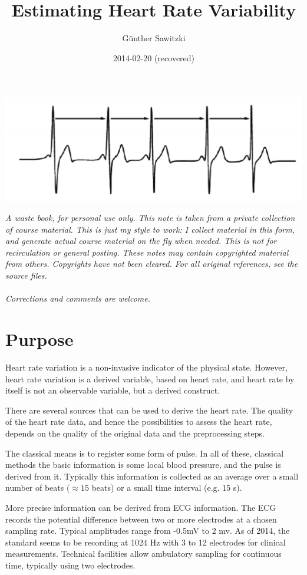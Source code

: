 \documentclass[a4paper, english, utf8]{amsart}
\title{Estimating Heart Rate Variability}
\author[G. Sawitzki]{G\"unther Sawitzki}
\date{2014-02-20 (recovered)}
\begin{document}
\maketitle
{\centering
\includegraphics[width=0.6\linewidth]{../media/hrv1}

}
{
\parskip 0pt

\tableofcontents
}
\bigskip
\emph{A waste book, for personal use only. 
This note is taken from a private collection of course material. 
This is just my style to work:  
I collect material in this form, and generate actual course material on the fly when needed. 
This is not for recirculation or general posting. 
These notes may contain copyrighted material from others. 
Copyrights have not been cleared. For all original references, see the source files.\\
\ \\
Corrections and comments are welcome.}


\section{Purpose}
Heart rate variation is a non-invasive indicator of the physical state.
However, heart rate variation is a derived variable, based on heart
rate, and heart rate by itself is not an observable variable, but a
derived construct.

There are several sources that can be used to derive the heart rate. The
quality of the heart rate data, and hence the possibilities to 
assess the heart rate, depends on the quality of the original data and
the preprocessing steps.

The classical means is to register some form of pulse. In all of these,
classical methods the basic information is some local blood pressure, and the pulse
is derived from it. Typically this information is collected as an average
over a small number of beats ($\approx 15$ beats) or a small time interval (e.g. 15 s).

More precise information can be derived from ECG information. The ECG
records the potential difference between two or more electrodes at a
chosen sampling rate. Typical amplitudes range from -0.5mV to 2 mv. As
of 2014, the standard seems to be recording at 1024 Hz with 3 to 12 electrodes for 
clinical measurements. Technical
facilities allow ambulatory sampling for continuous time, typically using two electrodes.
\end{document}
